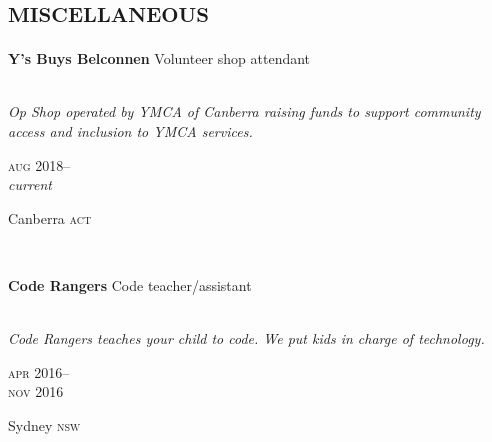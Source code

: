 

\section*{\textsc{miscellaneous}}
\vspace{-0.2cm}

\begin{minipage}[t]{0.75\textwidth}
\textbf{Y's Buys Belconnen}\phantom{..} Volunteer shop attendant\\
\\
{\small
\textit{Op Shop operated by YMCA of Canberra raising funds to support community access and inclusion to YMCA services.}
\par}
\end{minipage}
\begin{minipage}[t]{0.25\textwidth}
{
\hfill \textsc{aug} 2018--\\ 
\hspace*{0pt} \hfill \textit{current}
\par
{\small\hfill Canberra \textsc{act}}
}
\end{minipage}
\\

\begin{minipage}[t]{0.75\textwidth}
\textbf{Code Rangers}\phantom{..} Code teacher/assistant \\
\\
{\small
\textit{Code Rangers teaches your child to code. We put kids in charge of technology.}
\par}
\end{minipage}
\begin{minipage}[t]{0.25\textwidth}
{
\hfill \textsc{apr} 2016--\\ 
\hspace*{0pt} \hfill \textsc{nov} 2016
\par
{\small\hfill Sydney \textsc{nsw}}
}
\end{minipage}
\\

